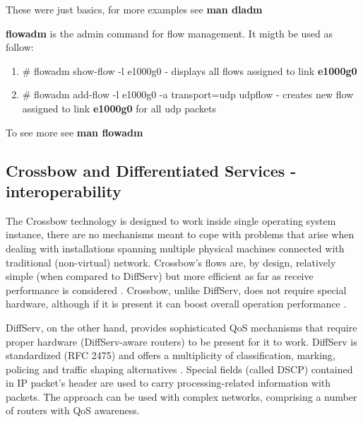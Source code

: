 \documentclass[11pt]{book}
\begin{document}
                        These were just basics, for more examples see \textbf{man dladm}

                        \medskip
        
                        \textbf{flowadm} is the admin command for flow management. It migth be used as follow:     

                        \begin{enumerate}
                                \item{\# flowadm show-flow -l e1000g0 - displays all flows assigned to link \textbf{e1000g0}}
                                \item{\# flowadm add-flow -l e1000g0 -a transport=udp udpflow - creates new flow assigned to link \textbf{e1000g0} for all udp packets}
                        \end{enumerate}

                        To see more see \textbf{man flowadm}


      \subsection{Crossbow and Differentiated Services - interoperability}
      \label{sub:sol:diffserv}

        The Crossbow technology is designed to work inside single operating system instance, there are no mechanisms
        meant to cope with problems that arise when dealing with installations spanning multiple physical machines
        connected with traditional (non-virtual) network. Crossbow's flows are, by design, relatively simple (when
        compared to DiffServ) but more efficient as far as receive performance is considered \cite{xbow-vertically}.
        Crossbow, unlike DiffServ, does not require special hardware, although if it is present it can boost overall
        operation performance \cite{xbow-vertically}.

        DiffServ, on the other hand, provides sophisticated QoS mechanisms that require proper hardware (DiffServ-aware
        routers) to be present for it to work. DiffServ is standardized (RFC 2475) and offers a multiplicity of
        classification, marking, policing and traffic shaping alternatives \cite{rfc2475}. Special fields (called DSCP)
        contained in IP packet's header are used to carry processing-related information with packets. The approach can
        be used with complex networks, comprising a number of routers with QoS awareness.
\end{document}

